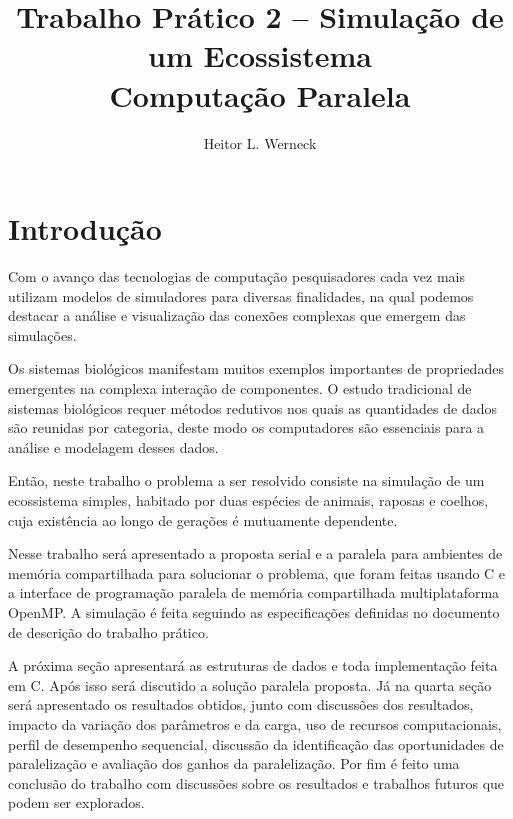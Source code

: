 \documentclass{article}
\title{Trabalho Prático 2 -- Simulação de um Ecossistema \\
	\large Computação Paralela}
\author{Heitor L. Werneck}
\begin{document}
\maketitle

\section{Introdução}

Com o avanço das tecnologias de computação pesquisadores cada vez mais utilizam modelos de simuladores para diversas finalidades, na qual podemos destacar a análise e visualização das conexões complexas que emergem das simulações.

Os sistemas biológicos manifestam muitos exemplos importantes de propriedades emergentes na complexa interação de componentes. O estudo tradicional de sistemas biológicos requer métodos redutivos nos quais as quantidades de dados são reunidas por categoria, deste modo os computadores são essenciais para a análise e modelagem desses dados.

Então, neste trabalho o problema a ser resolvido consiste na simulação de um ecossistema simples,
habitado por duas espécies de animais, raposas e coelhos, cuja existência ao longo de gerações é mutuamente dependente.

Nesse trabalho será apresentado a proposta serial e a paralela para ambientes de memória compartilhada para solucionar o problema, que foram feitas usando C e a interface de programação paralela de memória compartilhada multiplataforma OpenMP. A simulação é feita seguindo as especificações definidas no documento de descrição do trabalho prático.


A próxima seção apresentará as estruturas de dados e toda implementação feita em C. Após isso será discutido a solução paralela proposta. Já na quarta seção será apresentado os resultados obtidos, junto com discussões dos resultados, impacto da variação dos parâmetros e da carga, uso de recursos computacionais, perfil de desempenho sequencial, discussão da identificação das oportunidades de paralelização e avaliação dos ganhos da paralelização. Por fim é feito uma conclusão do trabalho com discussões sobre os resultados e trabalhos futuros que podem ser explorados.

\end{document}
